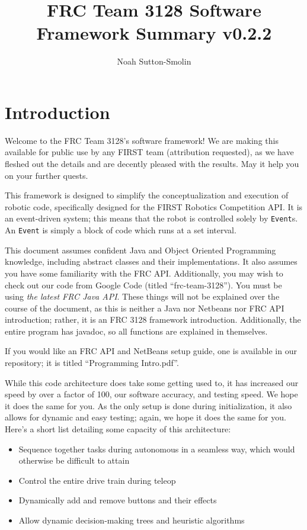 \documentclass[a4paper]{article}
\title{FRC Team 3128 Software Framework Summary v0.2.2}
\author{Noah Sutton-Smolin}
\begin{document}
\maketitle\tableofcontents\pagebreak

\section{Introduction} Welcome to the FRC Team 3128's software framework! We are making this available for public use by any FIRST team (attribution requested), as we have fleshed out the details and are decently pleased with the results. May it help you on your further quests.

This framework is designed to simplify the conceptualization and execution of robotic code, specifically designed for the FIRST Robotics Competition API. It is an event-driven system; this means that the robot is controlled solely by \lstinline{Event}s. An \lstinline{Event} is simply a block of code which runs at a set interval. 

This document assumes confident Java and Object Oriented Programming knowledge, including abstract classes and their implementations. It also assumes you have some familiarity with the FRC API. Additionally, you may wish to check out our code from Google Code (titled ``frc-team-3128''). You must be using \textit{the latest FRC Java API}. These things will not be explained over the course of the document, as this is neither a Java nor Netbeans nor FRC API introduction; rather, it is an FRC 3128 framework introduction. Additionally, the entire program has javadoc, so all functions are explained in themselves.

If you would like an FRC API and NetBeans setup guide, one is available in our repository; it is titled ``Programming Intro.pdf''.

While this code architecture does take some getting used to, it has increased our speed by over a factor of 100, our software accuracy, and testing speed. We hope it does the same for you. As the only setup is done during initialization, it also allows for dynamic and easy testing; again, we hope it does the same for you. Here's a short list detailing some capacity of this architecture:

\begin{itemize}
	\item{Sequence together tasks during autonomous in a seamless way, which would otherwise be difficult to attain}
	\item{Control the entire drive train during teleop}
	\item{Dynamically add and remove buttons and their effects}
	\item{Allow dynamic decision-making trees and heuristic algorithms}
\end{itemize}
\end{document}
